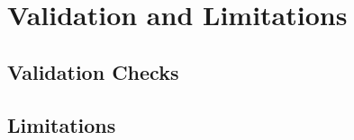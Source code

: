 \section{Validation and Limitations}
\label{sec:validation_limitations}


\subsection{Validation Checks}
\label{subsec:validation_checks}


\subsection{Limitations}
\label{subsec:limitations}

